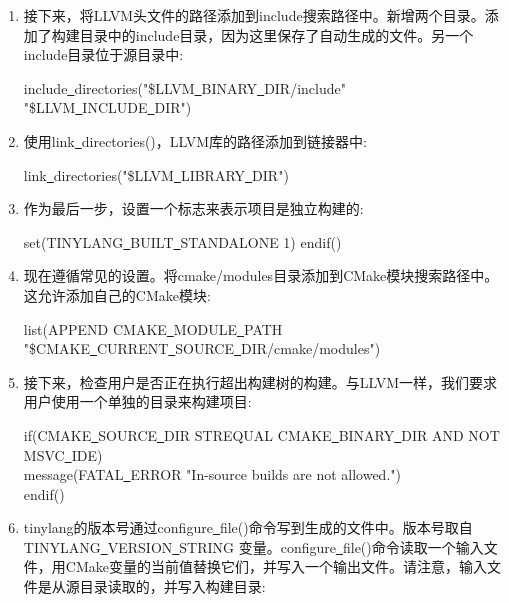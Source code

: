 \begin{enumerate}
 	\item 接下来，将LLVM头文件的路径添加到include搜索路径中。新增两个目录。添加了构建目录中的include目录，因为这里保存了自动生成的文件。另一个include目录位于源目录中:
 	\begin{tcolorbox}[colback=white,colframe=black]
 		include\underline{~}directories("\${LLVM\underline{~}BINARY\underline{~}DIR}/include" \\
 		"\${LLVM\underline{~}INCLUDE\underline{~}DIR}")
 	\end{tcolorbox}
 	\item 使用link\underline{~}directories()，LLVM库的路径添加到链接器中:
 	\begin{tcolorbox}[colback=white,colframe=black]
 		link\underline{~}directories("\${LLVM\underline{~}LIBRARY\underline{~}DIR}")
 	\end{tcolorbox}
 	\item 作为最后一步，设置一个标志来表示项目是独立构建的:
 	\begin{tcolorbox}[colback=white,colframe=black]
 		set(TINYLANG\underline{~}BUILT\underline{~}STANDALONE 1)
      endif()
 	\end{tcolorbox}
 	\item 现在遵循常见的设置。将cmake/modules目录添加到CMake模块搜索路径中。这允许添加自己的CMake模块:
 	\begin{tcolorbox}[colback=white,colframe=black]
      list(APPEND CMAKE\underline{~}MODULE\underline{~}PATH \\
 		"\${CMAKE\underline{~}CURRENT\underline{~}SOURCE\underline{~}DIR}/cmake/modules")
 	\end{tcolorbox}
 	\item 接下来，检查用户是否正在执行超出构建树的构建。与LLVM一样，我们要求用户使用一个单独的目录来构建项目:
 	\begin{tcolorbox}[colback=white,colframe=black]
 		if(CMAKE\underline{~}SOURCE\underline{~}DIR STREQUAL CMAKE\underline{~}BINARY\underline{~}DIR AND NOT MSVC\underline{~}IDE) \\
   		  message(FATAL\underline{~}ERROR "In-source builds are not allowed.") \\
 		endif()
 	\end{tcolorbox}
 	\item tinylang的版本号通过configure\underline{~}file()命令写到生成的文件中。版本号取自TINYLANG\underline{~}VER\allowbreak SION\underline{~}STRING 变量。configure\underline{~}file()命令读取一个输入文件，用CMake变量的当前值替换它们，并写入一个输出文件。请注意，输入文件是从源目录读取的，并写入构建目录:

\end{enumerate}
